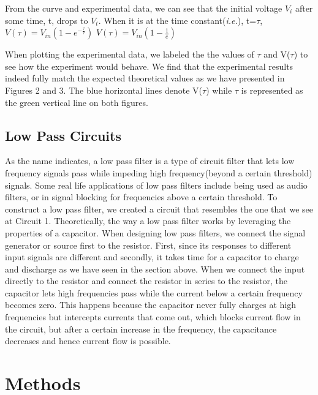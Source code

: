 \documentclass[twocolumn]{article}\usepackage[english]{babel}
\begin{document}
From the curve and experimental data, we can see that the initial voltage
$V_i$ after some time, t, drops to $V_t$. When it is at the time
constant(\textit{i.e.}), t=$\tau$, \newline \newline
\(V(\tau) = V_{in}\left(1 - e^{-\frac{\tau}{\tau}}\right)\) \newline
\(V(\tau) = V_{in}\left(1-\frac{1}{e}\right)\) \newline 

When plotting the experimental data, we labeled the the values of $\tau$ and V($\tau$) to see how the experiment would behave. We find that the experimental results indeed fully match the expected theoretical values as we have presented in Figures 2 and 3. The blue horizontal lines denote V($\tau$) while $\tau$ is represented as the green vertical line on both figures.   
\subsection{Low Pass Circuits}
As the name indicates, a low pass filter is a type of circuit filter that lets low frequency signals pass while impeding high frequency(beyond a certain threshold) signals. Some real life applications of low pass filters include being used as audio filters, or in signal blocking for frequencies above a certain threshold. To construct a low pass filter, we created a circuit that resembles the one that we see at Circuit 1. Theoretically, the way a low pass filter works by leveraging the properties of a capacitor. When designing low pass filters, we connect the signal generator or source first to the resistor. First, since its responses to different input signals are different and secondly, it takes time for a capacitor to charge and discharge as we have seen in the section above. 
When we connect the input directly to the resistor and connect the resistor in series to the resistor, the capacitor lets high frequencies pass while the current below a certain frequency becomes zero. This happens because the capacitor never fully charges at high frequencies but intercepts currents that come out, which blocks current flow in the circuit, but after a certain increase in the frequency, the capacitance decreases and hence current flow is possible.\cite{enwiki:1048317561}
\section{Methods}
\end{document}
